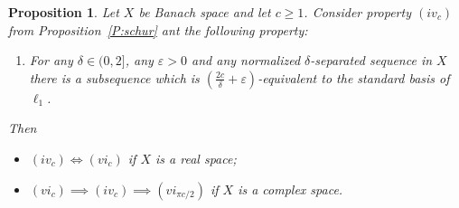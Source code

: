 \documentclass{amsart}
\numberwithin{equation}{section}
\newtheorem{prop}[thm]{Proposition}
\theoremstyle{definition}
\def\iff{\Longleftrightarrow}
\begin{document}
\begin{prop}\label{P:strongschur}
Let $X$ be Banach space and let $c\ge 1$. Consider property $(iv_c)$ from Proposition~\ref{P:schur} ant the following property:
\begin{enumerate}[$(vi_c)$]
    \item For any $\delta\in(0,2]$, any $\varepsilon>0$ and any normalized $\delta$-separated sequence in $X$ there is a subsequence which is $(\frac{2c}\delta+\varepsilon)$-equivalent to the standard basis of $\ell_1$.
\end{enumerate}   
Then
\begin{itemize}
    \item $(iv_c)\iff(vi_c)$ if $X$ is a real space;
    \item $(vi_c)\implies (iv_c)\implies(vi_{\pi c/2})$ if $X$ is a complex space.
\end{itemize}
\end{prop}
\end{document}
